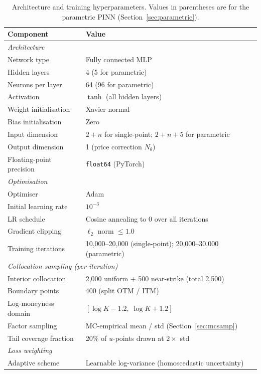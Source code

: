 \documentclass[review,12pt]{elsarticle}
\begin{document}
\begin{table}[t]
\centering
\caption{Architecture and training hyperparameters.  Values in parentheses are
for the parametric PINN (Section~\ref{sec:parametric}).}
\label{tab:arch}
\begin{tabular}{ll}
\toprule
\textbf{Component} & \textbf{Value} \\
\midrule
\multicolumn{2}{l}{\textit{Architecture}} \\
Network type & Fully connected MLP \\
Hidden layers & 4 (5 for parametric) \\
Neurons per layer & 64 (96 for parametric) \\
Activation & $\tanh$ (all hidden layers) \\
Weight initialisation & Xavier normal \\
Bias initialisation & Zero \\
Input dimension & $2 + n$ for single-point; $2 + n + 5$ for parametric \\
Output dimension & 1 (price correction $N_\theta$) \\
Floating-point precision & \texttt{float64} (PyTorch) \\
\midrule
\multicolumn{2}{l}{\textit{Optimisation}} \\
Optimiser & Adam \citep{kingma2015adam} \\
Initial learning rate & $10^{-3}$ \\
LR schedule & Cosine annealing to $0$ over all iterations \\
Gradient clipping & $\ell_2$ norm $\leq 1.0$ \\
Training iterations & 10,000--20,000 (single-point); 20,000--30,000 (parametric) \\
\midrule
\multicolumn{2}{l}{\textit{Collocation sampling (per iteration)}} \\
Interior collocation & 2,000 uniform + 500 near-strike (total 2,500) \\
Boundary points & 400 (split OTM / ITM) \\
Log-moneyness domain & $[\log K - 1.2,\;\log K + 1.2]$ \\
Factor sampling & MC-empirical mean / std (Section~\ref{sec:mcsamp}) \\
Tail coverage fraction & 20\% of $u$-points drawn at $2\times$ std \\
\midrule
\multicolumn{2}{l}{\textit{Loss weighting}} \\
Adaptive scheme & Learnable log-variance (homoscedastic uncertainty) \\

\end{tabular}
\end{table}
\end{document}
